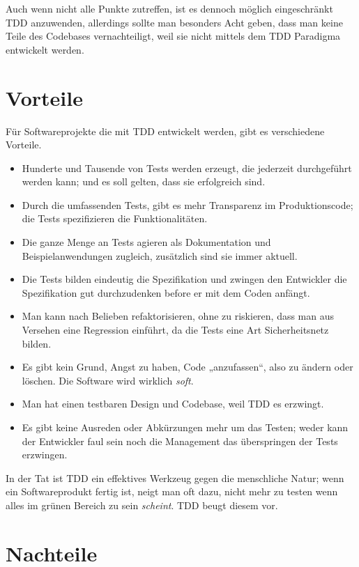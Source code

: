 \documentclass{mitschrift}
\begin{document}
Auch wenn nicht alle Punkte zutreffen, ist es dennoch möglich eingeschränkt TDD
anzuwenden, allerdings sollte man besonders Acht geben, dass man keine Teile
des Codebases vernachteiligt, weil sie nicht mittels dem TDD Paradigma
entwickelt werden.

\section{Vorteile}

Für Softwareprojekte die mit TDD entwickelt werden, gibt es verschiedene
Vorteile.

\begin{itemize}
    \item Hunderte und Tausende von Tests werden erzeugt, die jederzeit
        durchgeführt werden kann; und es soll gelten, dass sie erfolgreich
        sind.
    \item Durch die umfassenden Tests, gibt es mehr Transparenz im
        Produktionscode; die Tests spezifizieren die Funktionalitäten.
    \item Die ganze Menge an Tests agieren als Dokumentation und
        Beispielanwendungen zugleich, zusätzlich sind sie immer aktuell.
    \item Die Tests bilden eindeutig die Spezifikation und zwingen den
        Entwickler die Spezifikation gut durchzudenken before er mit dem Coden
        anfängt.
    \item Man kann nach Belieben refaktorisieren, ohne zu riskieren,
        dass man aus Versehen eine Regression einführt, da die Tests eine Art
        Sicherheitsnetz bilden.
    \item Es gibt kein Grund, Angst zu haben, Code „anzufassen“, also zu ändern
        oder löschen. Die Software wird wirklich \emph{soft}. \cite{UncleBob}
    \item Man hat einen testbaren Design und Codebase, weil TDD es erzwingt.
    \item Es gibt keine Ausreden oder Abkürzungen mehr um das Testen; weder
        kann der Entwickler faul sein noch die Management das überspringen der
        Tests erzwingen.
\end{itemize}

In der Tat ist TDD ein effektives Werkzeug gegen die menschliche Natur; wenn
ein Softwareprodukt fertig ist, neigt man oft dazu, nicht mehr zu testen wenn
alles im grünen Bereich zu sein \emph{scheint}. TDD beugt diesem vor.

\section{Nachteile}
\end{document}
